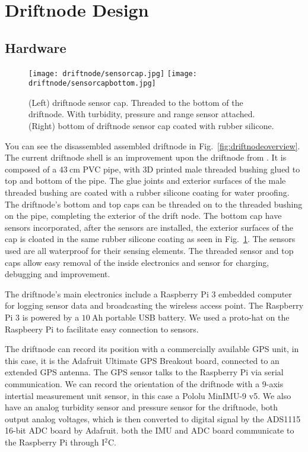 \section[Design]{Driftnode Design}

\subsection[Hardware]{Hardware}

\begin{figure}[h]
	\begin{center}
	\texttt{[image: driftnode/sensorcap.jpg]}
	\texttt{[image: driftnode/sensorcapbottom.jpg]}
	\caption[Driftnode]{
		(Left) driftnode sensor cap. Threaded to the bottom of the driftnode. With turbidity, pressure and range sensor attached.
		(Right) bottom of driftnode sensor cap coated with rubber silicone.
	} \label{fig:sensorcap}
	\end{center}
	\vspace{-1em}
\end{figure}

You can see the disassembled assembled driftnode in Fig.~\ref{fig:driftnodeoverview}.
The current driftnode shell is an improvement upon the driftnode from \cite{drifterUSC}.
It is composed of a $\SI{43}{\centi\metre}$ PVC pipe, with 3D printed male threaded bushing glued to top and bottom of the pipe.
The glue joints and exterior surfaces of the male threaded bushing are coated with a rubber silicone coating for water proofing.
The driftnode's bottom and top caps can be threaded on to the threaded bushing on the pipe, completing the exterior of the drift node.
The bottom cap have sensors incorporated, after the sensors are installed, the exterior surfaces of the cap is cloated in the same rubber silicone coating as seen in Fig.~\ref{fig:sensorcap}.
The sensors used are all waterproof for their sensing elements.
The threaded sensor and top caps allow easy removal of the inside electronics and sensor for charging, debugging and improvement.

The driftnode's main electronics include a Raspberry Pi 3 embedded computer for logging sensor data and broadcasting the wireless access point.
The Raspberry Pi 3 is powered by a $\SI{10}{\ampere\hour}$ portable USB battery.
We used a proto-hat on the Raspbeery Pi to facilitate easy connection to sensors.

The driftnode can record its position with a commercially available GPS unit, in this case, it is the Adafruit Ultimate GPS Breakout board, connected to an extended GPS antenna.
The GPS sensor talks to the Raspberry Pi via serial communication.
We can record the orientation of the driftnode with a 9-axis intertial measurement unit sensor, in this case a Pololu MinIMU-9 v5.
We also have an analog turbidity sensor and pressure sensor for the driftnode, both output analog voltages, which is then converted to digital signal by the ADS1115 16-bit ADC board by Adafruit.
both the IMU and ADC board communicate to the Raspberry Pi through I$^{2}$C.

